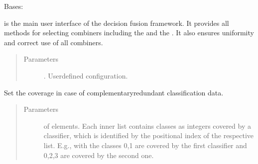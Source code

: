 \documentclass[letterpaper,10pt,english]{sphinxmanual}
\begin{document}
\begin{fulllineitems}
\label{\detokenize{pusion.control.decision_processor:pusion.control.decision_processor.DecisionProcessor}}
\sphinxAtStartPar
Bases: 

\sphinxAtStartPar
{\hyperref[\detokenize{pusion.control.decision_processor:pusion.control.decision_processor.DecisionProcessor}]{}} is the main user interface of the decision fusion framework. It provides all methods
for selecting combiners including the {\hyperref[\detokenize{pusion.auto.auto_combiner:ac-cref}]{}} and the {\hyperref[\detokenize{pusion.auto.generic_combiner:gc-cref}]{}}.
It also ensures uniformity and correct use of all  combiners.
\begin{quote}\begin{description}
\item[{Parameters}] \leavevmode
\sphinxAtStartPar
{} \textendash{} {\hyperref[\detokenize{pusion.model.configuration:pusion.model.configuration.Configuration}]{}}. User\sphinxhyphen{}defined configuration.

\end{description}\end{quote}

\begin{fulllineitems}
\label{\detokenize{pusion.control.decision_processor:pusion.control.decision_processor.DecisionProcessor.set_coverage}}
\sphinxAtStartPar
Set the coverage in case of complementary\sphinxhyphen{}redundant classification data.
\begin{quote}\begin{description}
\item[{Parameters}] \leavevmode
\sphinxAtStartPar
{} \textendash{}  of  elements. Each inner list contains classes as integers covered by a
classifier, which is identified by the positional index of the respective list. E.g., with
\sphinxcode{\sphinxupquote{{[}{[}0,1{]}, {[}0,2,3{]}{]}}} the classes 0,1 are covered by the first classifier and 0,2,3 are covered by the
second one.


\end{description}
\end{quote}
\end{fulllineitems}
\end{fulllineitems}
\end{document}
